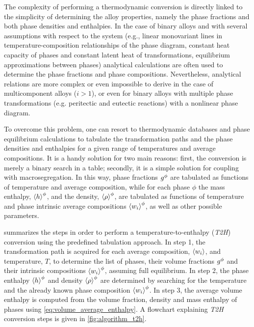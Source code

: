The complexity of performing a thermodynamic conversion is directly linked 
to the simplicity of determining the alloy properties, namely the phase fractions 
and both phase densities and enthalpies. In the case of binary alloys and with several assumptions 
with respect to the system (e.g., linear monovariant lines in temperature-composition 
relationships of the phase diagram, constant heat capacity of phases and constant latent heat of transformations, 
equilibrium approximations between phases) analytical calculations are often used to determine 
the phase fractions and phase compositions. 
Nevertheless, analytical relations are more complex or even impossible to derive 
in the case of multicomponent alloys ($i>1$), or even for binary alloys with multiple phase transformations
(e.g. peritectic and eutectic reactions) with a nonlinear phase diagram. 

To overcome this problem, one can resort to 
thermodynamic databases and phase equilibrium calculations to tabulate the transformation paths 
and the phase densities and enthalpies for a given range of temperatures and average compositions. It is a handy 
solution for two main reasons: first, the conversion is merely a binary search in a table; secondly, 
it is a simple solution for coupling with macrosegregation. In this way, phase fractions ${g^{\phi}} $ are 
tabulated as functions of temperature and average composition, while for each phase $\phi$ the mass 
enthalpy, $\left \langle h \right \rangle^{\phi} $, and the density, $\left \langle \rho \right \rangle^{\phi} $, are tabulated as functions of temperature and phase 
intrinsic average compositions $\left \langle w_i \right \rangle^\phi$, as well as other possible parameters. 

 summarizes the 
steps in order to perform a temperature-to-enthalpy (\emph{T2H}) conversion using the predefined tabulation 
approach. 
In step 1, the transformation path is acquired for each average composition, $\left \langle w_i \right \rangle$, and temperature, $T$, 
to determine the list of phases, their volume fractions ${g^{\phi}} $ and their intrinsic compositions $\left \langle w_i \right \rangle^{\phi}$, assuming
full equilibrium. In step 2, the phase enthalpy $\left \langle h \right \rangle^{\phi} $  and density $\left \langle \rho \right \rangle^{\phi} $ are determined by searching for the temperature and 
the already known phase composition $\left \langle w_i \right \rangle^{\phi}$. In step 3, the average volume enthalpy is computed from the 
volume fraction, density and mass enthalpy of phases using \cref{eq:volume_average_enthalpy}. 
A flowchart explaining \emph{T2H} conversion steps is given in \cref{fig:algorithm_t2h}.


